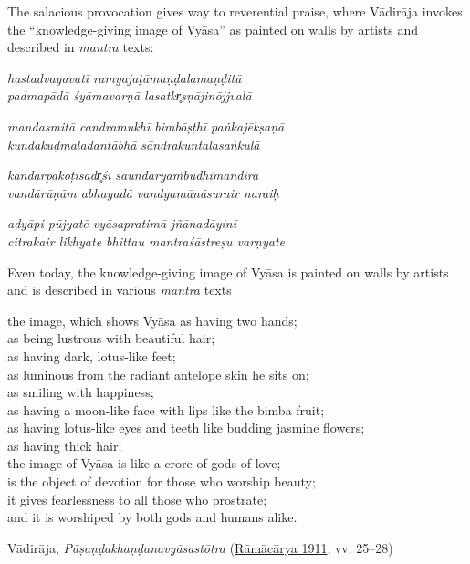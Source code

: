 The salacious provocation gives way to reverential praise, where Vādirāja invokes the “knowledge-giving image of Vyāsa” as painted on walls by artists and described in \emph{mantra} texts: 

\begin{pullquote}\raggedright
      \emph{hastadvayavatī ramyajaṭāmaṇḍalamaṇḍitā}\\
\emph{padmapādā śyāmavarṇā lasatkr̥ṣṇājinōjjvalā}

\emph{mandasmitā candramukhī bimbōṣṭhī paṅkajēkṣaṇā}\\
\emph{kundakuḍmaladantābhā sāndrakuntalasaṅkulā}

\emph{kandarpakōṭisadr̥śī saundaryāṁbudhimandirā}\\
\emph{vandārūṇām abhayadā vandyamānāsurair naraiḥ}

\emph{adyāpi pūjyatē vyāsapratimā jñānadāyinī}\\
\emph{citrakair likhyate bhittau mantraśāstreṣu varṇyate}
\end{pullquote}
      
\begin{pullquote}
Even today, the knowledge-giving image of Vyāsa is painted on walls by artists and is described in various \emph{mantra} texts  \Dash  


	
	      the image, which shows Vyāsa as having two hands;\\
	      as being lustrous with beautiful hair;\\
	      as having dark, lotus-like feet;\\
	      as luminous from the radiant antelope skin he sits on;\\
	      as smiling with happiness;\\
	      as having a moon-like face with lips like the bimba fruit;\\
	      as having lotus-like eyes and teeth like budding jasmine flowers;\\
	      as having thick hair;\\
	      the image of Vyāsa is like a crore of gods of love;\\
	      is the object of devotion for those who worship beauty;\\
	      it gives fearlessness to all those who prostrate;\\
	      and it is worshiped by both gods and humans alike.
	    \\


\medskip\hfill\begin{minipage}{0.9\textwidth}\small\hfill
Vādirāja, \emph{{Pāṣaṇḍakhaṇḍanavyāsastōtra}} (\hyperref[VP]{Rāmācārya 1911}, vv. 25–28)\end{minipage}\hspace{2em}
\end{pullquote}

